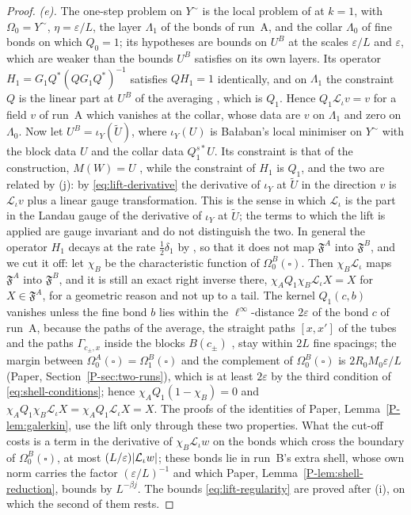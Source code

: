 \documentclass[11pt]{preprint}
\DeclarePairedDelimiter{\abs}{\lvert}{\rvert}
\numberwithin{equation}{section}
\theoremstyle{definition}
\theoremstyle{remark}
\theoremstyle{plain}
\begin{document}
\begin{proof}
\emph{(e).} The one-step problem on $Y^\sim$ is the local problem of \cite[p.~417]{BalabanPBG} at $k = 1$, with $\Omega_0 = Y^\sim$, $\eta = \varepsilon/L$, the layer $\Lambda_1$ of the bonds of run~A, and the collar $\Lambda_0$ of fine bonds on which $Q_0 = 1$; its hypotheses \cite[(3.35), (3.36)]{BalabanPBG} are bounds on $U^B$ at the scales $\varepsilon/L$ and $\varepsilon$, which are weaker than the bounds $U^B$ satisfies on its own layers. Its operator $H_1 = G_1Q^*(QG_1Q^*)^{-1}$ \cite[(3.129), p.~421]{BalabanPBG} satisfies $QH_1 = 1$ identically, and on $\Lambda_1$ the constraint $Q$ is the linear part at $U^B$ of the averaging \cite[(3.13), p.~392]{BalabanPBG}, which is $Q_1$. Hence $Q_1\mathcal L_\iota v = v$ for a field $v$ of run~A which vanishes at the collar, whose data are $v$ on $\Lambda_1$ and zero on $\Lambda_0$. Now let $U^B = \iota_Y(\tilde U)$, where $\iota_Y(U)$ is Ba{\l}aban's local minimiser on $Y^\sim$ with the block data $U$ and the collar data $Q^{s*}_1U$. Its constraint is that of the construction, $M(W) = U$ \cite[(3), p.~278]{BalabanVAR}, while the constraint of $H_1$ is $Q_1$, and the two are related by (j): by \eqref{eq:lift-derivative} the derivative of $\iota_Y$ at $\tilde U$ in the direction $v$ is $\mathcal L_\iota v$ plus a linear gauge transformation. This is the sense in which $\mathcal L_\iota$ is the part in the Landau gauge of the derivative of $\iota_Y$ at $\tilde U$; the terms to which the lift is applied are gauge invariant and do not distinguish the two. In general the operator $H_1$ decays at the rate $\frac12\delta_1$ by \cite[(3.133), p.~422]{BalabanPBG}, so that it does not map $\mathfrak F^A$ into $\mathfrak F^B$, and we cut it off: let $\chi_B$ be the characteristic function of $\Omega^B_0(\square)$. Then $\chi_B\mathcal L_\iota$ maps $\mathfrak F^A$ into $\mathfrak F^B$, and it is still an exact right inverse there, $\chi_AQ_1\chi_B\mathcal L_\iota X = X$ for $X \in \mathfrak F^A$, for a geometric reason and not up to a tail. The kernel $Q_1(c, b)$ vanishes unless the fine bond $b$ lies within the $\ell^\infty$-distance $2\varepsilon$ of the bond $c$ of run~A, because the paths of the average, the straight paths $[x, x']$ of the tubes and the paths $\Gamma_{c_\pm,x}$ inside the blocks $B(c_\pm)$ \cite[(124), p.~36]{BalabanAVG}, stay within $2L$ fine spacings; the margin between $\Omega^A_0(\square) = \Omega^B_1(\square)$ and the complement of $\Omega^B_0(\square)$ is $2R_0M_0\varepsilon/L$ (Paper, Section~\ref{P-sec:two-runs}), which is at least $2\varepsilon$ by the third condition of \eqref{eq:shell-conditions}; hence $\chi_AQ_1(1 - \chi_B) = 0$ and $\chi_AQ_1\chi_B\mathcal L_\iota X = \chi_AQ_1\mathcal L_\iota X = X$. The proofs of the identities of Paper, Lemma~\ref{P-lem:galerkin}, use the lift only through these two properties. What the cut-off costs is a term in the derivative of $\chi_B\mathcal L_\iota w$ on the bonds which cross the boundary of $\Omega^B_0(\square)$, at most $(L/\varepsilon)\abs{\mathcal L_\iota w}$; these bonds lie in run~B's extra shell, whose own norm carries the factor $(\varepsilon/L)^{-1}$ and which Paper, Lemma~\ref{P-lem:shell-reduction}, bounds by $L^{-\beta j}$. The bounds \eqref{eq:lift-regularity} are proved after (i), on which the second of them rests.


\end{proof}
\end{document}
